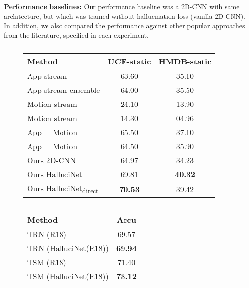 \documentclass[10pt,twocolumn,letterpaper]{article}
\begin{document}
\noindent\textbf{Performance baselines:} Our performance baseline was a 2D-CNN with same architecture, but which was trained without hallucination loss (vanilla 2D-CNN). In addition, we also compared the performance against other popular approaches from the literature, specified in each experiment. 
\begin{table}
\centering
\small
\begin{subfigure}[t]{\columnwidth}
\setlength{\tabcolsep}{6pt}
\begin{tabular}{lcc}
\toprule
\textbf{Method}                      & \textbf{UCF-static} & \textbf{HMDB-static} \\
\midrule
App stream \cite{im2flow}         & 63.60               & 35.10                \\
App stream ensemble \cite{im2flow}  & 64.00               & 35.50                \\
Motion stream \cite{im2flow}               & 24.10               & 13.90                \\
Motion stream \cite{walker}           & 14.30               & 04.96                \\
App + Motion \cite{im2flow}         & 65.50               & 37.10                \\
App + Motion \cite{walker}       & 64.50               & 35.90                \\
\midrule
Ours 2D-CNN               & 64.97               & 34.23                \\
Ours HalluciNet\textsubscript & 69.81 & \textbf{40.32} \\
Ours HalluciNet\textsubscript{direct} &	\textbf{70.53}				& 39.42 \\
\bottomrule
\end{tabular}
\caption{}
\label{tab:action_rec}
\end{subfigure}
\begin{subfigure}[t]{0.45\columnwidth}
\small
\centering
\begin{tabular}{@{}lc@{}}
\toprule
\textbf{Method}       & \textbf{Accu} \\ \midrule
TRN (R18)             & 69.57             \\
TRN (HalluciNet(R18)) & \textbf{69.94}    \\
TSM (R18)             & 71.40             \\
TSM (HalluciNet(R18)) & \textbf{73.12}    \\ \bottomrule
\end{tabular}
\caption{}
\label{tab:trn_tsm}

\end{subfigure}
\end{table}
\end{document}
